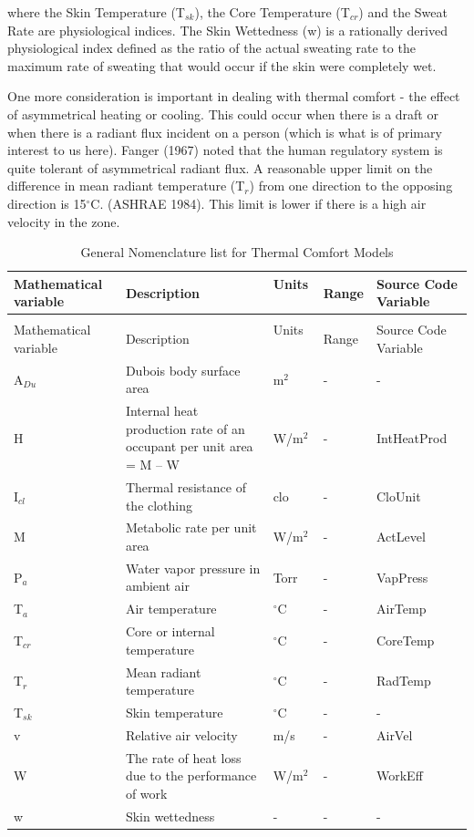 where the Skin Temperature (T\(_{sk}\)), the Core Temperature (T\(_{cr}\)) and the Sweat Rate are physiological indices. The Skin Wettedness (w) is a rationally derived physiological index defined as the ratio of the actual sweating rate to the maximum rate of sweating that would occur if the skin were completely wet.

One more consideration is important in dealing with thermal comfort - the effect of asymmetrical heating or cooling. This could occur when there is a draft or when there is a radiant flux incident on a person (which is what is of primary interest to us here). Fanger (1967) noted that the human regulatory system is quite tolerant of asymmetrical radiant flux. A reasonable upper limit on the difference in mean radiant temperature (T\(_{r}\)) from one direction to the opposing direction is 15\(^{\circ}\)C. (ASHRAE 1984). This limit is lower if there is a high air velocity in the zone.

\begin{longtable}[c]{p{1.2in}p{2.0in}p{0.8in}p{0.8in}p{1.2in}}
\caption{General Nomenclature list for Thermal Comfort Models \label{table:general-nomenclature-list-for-thermal-comfort}} \tabularnewline
\toprule 
Mathematical variable & Description & Units ~ & Range & Source Code Variable \tabularnewline
\midrule
\endfirsthead

\caption[]{General Nomenclature list for Thermal Comfort Models} \tabularnewline
\toprule 
Mathematical variable & Description & Units ~ & Range & Source Code Variable \tabularnewline
\midrule
\endhead

A\(_{Du}\) & Dubois body surface area & m\(^{2}\) & - & - \tabularnewline
H & Internal heat production rate of an occupant per unit area = M – W & W/m\(^{2}\) & - & IntHeatProd \tabularnewline
I\(_{cl}\) & Thermal resistance of the clothing & clo & - & CloUnit \tabularnewline
M & Metabolic rate per unit area & W/m\(^{2}\) & - & ActLevel \tabularnewline
P\(_{a}\) & Water vapor pressure in ambient air & Torr & - & VapPress \tabularnewline
T\(_{a}\) & Air temperature & \(^{\circ}\)C & - & AirTemp \tabularnewline
T\(_{cr}\) & Core or internal temperature & \(^{\circ}\)C & - & CoreTemp \tabularnewline
T\(_{r}\) & Mean radiant temperature & \(^{\circ}\)C & - & RadTemp \tabularnewline
T\(_{sk}\) & Skin temperature & \(^{\circ}\)C & - & - \tabularnewline
v & Relative air velocity & m/s & - & AirVel \tabularnewline
W & The rate of heat loss due to the performance of work & W/m\(^{2}\) & - & WorkEff \tabularnewline
w & Skin wettedness & - & - & - \tabularnewline
\bottomrule
\end{longtable}

